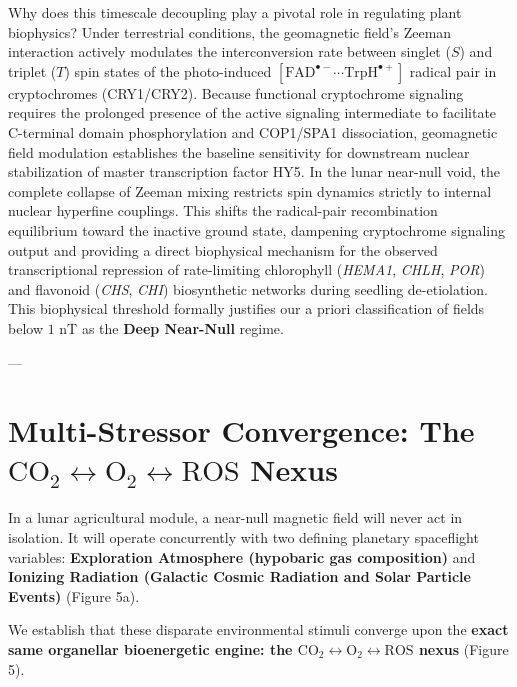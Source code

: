 \documentclass[default,sn-nature,iicol]{sn-jnl}
\begin{document}
Why does this timescale decoupling play a pivotal role in regulating plant biophysics? Under terrestrial conditions, the geomagnetic field's Zeeman interaction actively modulates the interconversion rate between singlet ($S$) and triplet ($T$) spin states of the photo-induced $[\text{FAD}^{\bullet-} \cdots \text{TrpH}^{\bullet+}]$ radical pair in cryptochromes (CRY1/CRY2). Because functional cryptochrome signaling requires the prolonged presence of the active signaling intermediate to facilitate C-terminal domain phosphorylation and COP1/SPA1 dissociation, geomagnetic field modulation establishes the baseline sensitivity for downstream nuclear stabilization of master transcription factor HY5. In the lunar near-null void, the complete collapse of Zeeman mixing restricts spin dynamics strictly to internal nuclear hyperfine couplings. This shifts the radical-pair recombination equilibrium toward the inactive ground state, dampening cryptochrome signaling output and providing a direct biophysical mechanism for the observed transcriptional repression of rate-limiting chlorophyll (\textit{HEMA1}, \textit{CHLH}, \textit{POR}) and flavonoid (\textit{CHS}, \textit{CHI}) biosynthetic networks during seedling de-etiolation. This biophysical threshold formally justifies our a priori classification of fields below $1\text{ nT}$ as the \textbf{Deep Near-Null} regime.

---


\section{Multi-Stressor Convergence: The $\text{CO}_2 \leftrightarrow \text{O}_2 \leftrightarrow \text{ROS}$ Nexus}

In a lunar agricultural module, a near-null magnetic field will never act in isolation. It will operate concurrently with two defining planetary spaceflight variables: \textbf{Exploration Atmosphere (hypobaric gas composition)} and \textbf{Ionizing Radiation (Galactic Cosmic Radiation and Solar Particle Events)} \cite{ref7,ref8,ref66} (Figure 5a). 

We establish that these disparate environmental stimuli converge upon the \textbf{exact same organellar bioenergetic engine: the $\text{CO}_2 \leftrightarrow \text{O}_2 \leftrightarrow \text{ROS}$ nexus} (Figure 5).
\end{document}
